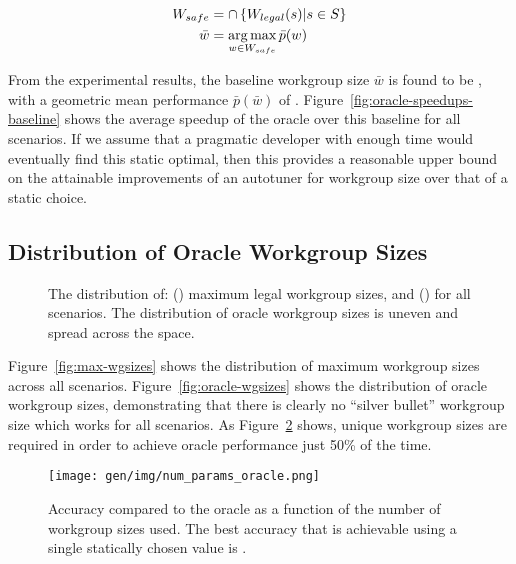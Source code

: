 \begin{align}
W_{safe} &= \cap \left\{ W_{legal}(s) | s \in S \right\}\\
\bar{w} &= \operatorname*{arg\,max}_{w \in W_{safe}} \bar{p}(w)
\end{align}

From the experimental results, the baseline workgroup size $\bar{w}$
is found to be , with a geometric mean performance
$\bar{p}(\bar{w})$ of
. Figure~\ref{fig:oracle-speedups-baseline}
shows the average speedup of the oracle over this baseline for all
scenarios. If we assume that a pragmatic developer with enough time
would eventually find this static optimal, then this provides a
reasonable upper bound on the attainable improvements of an autotuner
for workgroup size over that of a static choice.


\subsection{Distribution of Oracle Workgroup Sizes}

\begin{figure}

\caption{%
  The distribution of: () maximum legal
  workgroup sizes, and () for all
  scenarios. The distribution of oracle workgroup sizes is uneven and
  spread across the space.%
}
\label{fig:heatmaps}
\end{figure}

Figure~\ref{fig:max-wgsizes} shows the distribution of maximum
workgroup sizes across all scenarios. Figure~\ref{fig:oracle-wgsizes}
shows the distribution of oracle workgroup sizes, demonstrating that
there is clearly no ``silver bullet'' workgroup size which works for
all scenarios. As Figure~\ref{fig:oracle-accuracy} shows,
 unique workgroup sizes are
required in order to achieve oracle performance just 50\% of the
time. 

\begin{figure}
\centering
\texttt{[image: gen/img/num\_params\_oracle.png]}
\caption{%
  Accuracy compared to the oracle as a function of the number of
  workgroup sizes used. The best accuracy that is achievable using a
  single statically chosen value is
  \protect.%
}
\label{fig:oracle-accuracy}
\end{figure}

